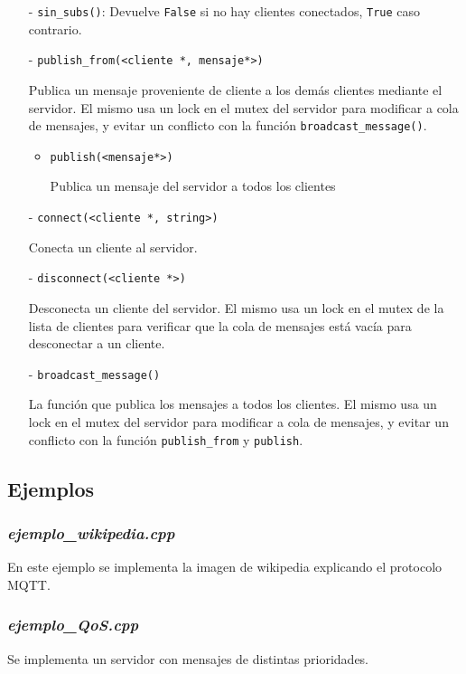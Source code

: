 \begin{itemize}
    \item[-] \verb|sin_subs()|:
    Devuelve \verb|False| si no hay clientes conectados, \verb|True| caso contrario.
    
    \item[-] \verb|publish_from(<cliente *, mensaje*>)| 
    
    Publica un mensaje proveniente de cliente a los demás clientes mediante el servidor. El mismo usa un lock en el mutex del servidor para modificar a cola de mensajes, y evitar un conflicto con la función \verb|broadcast_message()|.
    
    \begin{itemize}
        \item \verb|publish(<mensaje*>)|
    
        Publica un mensaje del servidor a todos los clientes
    \end{itemize}


    \item[-] \verb|connect(<cliente *, string>)| 
    
    Conecta un cliente al servidor.
    
    \item[-] \verb|disconnect(<cliente *>)|  
    
    Desconecta un cliente del servidor. El mismo usa un lock en el mutex de la lista de clientes para verificar que la  cola de mensajes está vacía para desconectar a un cliente.
    
    \item[-] \verb|broadcast_message()| 
    
    La función que publica los mensajes a todos los clientes. El mismo usa un lock en el mutex del servidor para modificar a cola de mensajes, y evitar un conflicto con la función \verb|publish_from| y \verb|publish|.
\end{itemize}




\subsection{Ejemplos}

\subsubsection{\textit{ejemplo\_wikipedia.cpp}}

En este ejemplo se implementa la imagen de wikipedia explicando el protocolo MQTT. 

\subsubsection{\textit{ejemplo\_QoS.cpp}}

Se implementa un servidor con mensajes de distintas prioridades.
